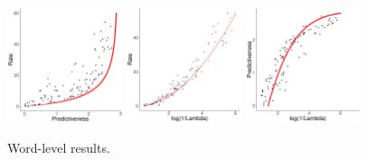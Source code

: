 \documentclass[entropy,article,submit,moreauthors,pdftex,10pt,a4paper]{Definitions/mdpi}
\begin{document}
\begin{figure}
\begin{center}
		\includegraphics[width=0.3\textwidth]{code/figures/ar-words-info-fitted.pdf}
\includegraphics[width=0.3\textwidth]{code/figures/ar-words-nlogbeta-mem-fitted.pdf}
\includegraphics[width=0.3\textwidth]{code/figures/ar-words-nlogbeta-ee-fitted.pdf}
	\end{center}
	\caption{Word-level results.}\label{fig:wordlevel-fit-1}
\end{figure}
\end{document}
